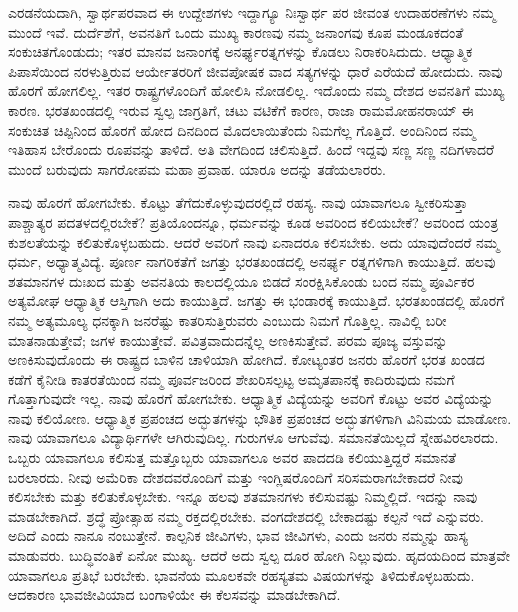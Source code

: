 ಎರಡನೆಯದಾಗಿ, ಸ್ವಾರ್ಥಪರವಾದ ಈ ಉದ್ದೇಶಗಳು ಇದ್ದಾಗ್ಯೂ ನಿಃಸ್ವಾರ್ಥ ಪರ ಜೀವಂತ ಉದಾಹರಣೆಗಳು ನಮ್ಮ ಮುಂದೆ ಇವೆ. ದುರ್ದೆಶೆಗೆ, ಅವನತಿಗೆ ಒಂದು ಮುಖ್ಯ ಕಾರಣವು ನಮ್ಮ ಜನಾಂಗವು ಕೂಪ ಮಂಡೂಕದಂತೆ ಸಂಕುಚಿತಗೊಂಡುದು; ಇತರ ಮಾನವ ಜನಾಂಗಕ್ಕೆ ಅನರ್ಘ್ಯರತ್ನಗಳನ್ನು ಕೊಡಲು ನಿರಾಕರಿಸಿದುದು. ಆಧ್ಯಾತ್ಮಿಕ ಪಿಪಾಸೆಯಿಂದ ನರಳುತ್ತಿರುವ ಆರ್ಯೇತರರಿಗೆ ಜೀವಪೋಷಕ ವಾದ ಸತ್ಯಗಳನ್ನು ಧಾರೆ ಎರೆಯದೆ ಹೋದುದು. ನಾವು ಹೊರಗೆ ಹೋಗಲಿಲ್ಲ. ಇತರ ರಾಷ್ಟ್ರಗಳೊಂದಿಗೆ ಹೋಲಿಸಿ ನೋಡಲಿಲ್ಲ. ಇದೊಂದು ನಮ್ಮ ದೇಶದ ಅವನತಿಗೆ ಮುಖ್ಯ ಕಾರಣ. ಭರತಖಂಡದಲ್ಲಿ ಇರುವ ಸ್ವಲ್ಪ ಜಾಗ್ರತಿಗೆ, ಚಟು ವಟಿಕೆಗೆ ಕಾರಣ, ರಾಜಾ ರಾಮಮೋಹನರಾಯ್​ ಈ ಸಂಕುಚಿತ ಚಿಪ್ಪಿನಿಂದ ಹೊರಗೆ ಹೋದ ದಿನದಿಂದ ಮೊದಲಾಯಿತೆಂದು ನಿಮಗೆಲ್ಲ ಗೊತ್ತಿದೆ. ಅಂದಿನಿಂದ ನಮ್ಮ ಇತಿಹಾಸ ಬೇರೊಂದು ರೂಪವನ್ನು ತಾಳಿದೆ. ಅತಿ ವೇಗದಿಂದ ಚಲಿಸುತ್ತಿದೆ. ಹಿಂದೆ ಇದ್ದವು ಸಣ್ಣ ಸಣ್ಣ ನದಿಗಳಾದರೆ ಮುಂದೆ ಬರುವುದು ಸಾಗರೋಪಮ ಮಹಾ ಪ್ರವಾಹ. ಯಾರೂ ಅದನ್ನು ತಡೆಯಲಾರರು. 

ನಾವು ಹೊರಗೆ ಹೋಗಬೇಕು. ಕೊಟ್ಟು ತೆಗೆದುಕೊಳ್ಳುವುದರಲ್ಲಿದೆ ರಹಸ್ಯ. ನಾವು ಯಾವಾಗಲೂ ಸ್ವೀಕರಿಸುತ್ತಾ ಪಾಶ್ಚಾತ್ಯರ ಪದತಳದಲ್ಲಿರಬೇಕೆ? ಪ್ರತಿಯೊಂದನ್ನೂ, ಧರ್ಮವನ್ನು ಕೂಡ ಅವರಿಂದ ಕಲಿಯಬೇಕೆ? ಅವರಿಂದ ಯಂತ್ರ ಕುಶಲತೆಯನ್ನು ಕಲಿತುಕೊಳ್ಳಬಹುದು. ಆದರೆ ಅವರಿಗೆ ನಾವು ಏನಾದರೂ ಕಲಿಸಬೇಕು. ಅದು ಯಾವುದೆಂದರೆ ನಮ್ಮ ಧರ್ಮ, ಅಧ್ಯಾತ್ಮವಿದ್ಯೆ. ಪೂರ್ಣ ನಾಗರಿಕತೆಗೆ ಜಗತ್ತು ಭರತಖಂಡದಲ್ಲಿ ಅನರ್ಘ್ಯ ರತ್ನಗಳಿಗಾಗಿ ಕಾಯುತ್ತಿದೆ. ಹಲವು ಶತಮಾನಗಳ ದುಃಖದ ಮತ್ತು ಅವನತಿಯ ಕಾಲದಲ್ಲಿಯೂ ಬಿಡದೆ ಸಂರಕ್ಷಿಸಿಕೊಂಡು ಬಂದ ನಮ್ಮ ಪೂರ್ವಿಕರ ಅತ್ಯಮೋಘ ಆಧ್ಯಾತ್ಮಿಕ ಆಸ್ತಿಗಾಗಿ ಅದು ಕಾಯುತ್ತಿದೆ. ಜಗತ್ತು ಈ ಭಂಡಾರಕ್ಕೆ ಕಾಯುತ್ತಿದೆ. ಭರತಖಂಡದಲ್ಲಿ ಹೊರಗೆ ನಮ್ಮ ಅತ್ಯಮೂಲ್ಯ ಧನಕ್ಕಾಗಿ ಜನರೆಷ್ಟು ಕಾತರಿಸುತ್ತಿರುವರು ಎಂಬುದು ನಿಮಗೆ ಗೊತ್ತಿಲ್ಲ. ನಾವಿಲ್ಲಿ ಬರೀ ಮಾತನಾಡುತ್ತೇವೆ; ಜಗಳ ಕಾಯುತ್ತೇವೆ. ಪವಿತ್ರವಾದುದನ್ನೆಲ್ಲ ಅಣಕಿಸುತ್ತೇವೆ. ಪರಮ ಪೂಜ್ಯ ವಸ್ತುವನ್ನು ಅಣಕಿಸುವುದೊಂದು ಈ ರಾಷ್ಟ್ರದ ಬಾಳಿನ ಚಾಳಿಯಾಗಿ ಹೋಗಿದೆ. ಕೋಟ್ಯಂತರ ಜನರು ಹೊರಗೆ ಭರತ ಖಂಡದ ಕಡೆಗೆ ಕೈನೀಡಿ ಕಾತರತೆಯಿಂದ ನಮ್ಮ ಪೂರ್ವಜರಿಂದ ಶೇಖರಿಸಲ್ಪಟ್ಟ ಅಮೃತಪಾನಕ್ಕೆ ಕಾದಿರುವುದು ನಮಗೆ ಗೊತ್ತಾಗುವುದೇ ಇಲ್ಲ. ನಾವು ಹೊರಗೆ ಹೋಗಬೇಕು. ಆಧ್ಯಾತ್ಮಿಕ ವಿದ್ಯೆಯನ್ನು ಅವರಿಗೆ ಕೊಟ್ಟು ಅವರ ವಿದ್ಯೆಯನ್ನು ನಾವು ಕಲಿಯೋಣ. ಆಧ್ಯಾತ್ಮಿಕ ಪ್ರಪಂಚದ ಅದ್ಭುತಗಳನ್ನು ಭೌತಿಕ ಪ್ರಪಂಚದ ಅದ್ಭುತಗಳಿಗಾಗಿ ವಿನಿಮಯ ಮಾಡೋಣ. ನಾವು ಯಾವಾಗಲೂ ವಿದ್ಯಾರ್ಥಿಗಳೇ ಆಗಿರುವುದಿಲ್ಲ. ಗುರುಗಳೂ ಆಗುವೆವು. ಸಮಾನತೆಯಿಲ್ಲದೆ ಸ್ನೇಹವಿರಲಾರದು. ಒಬ್ಬರು ಯಾವಾಗಲೂ ಕಲಿಸುತ್ತ ಮತ್ತೊಬ್ಬರು ಯಾವಾಗಲೂ ಅವರ ಪಾದದಡಿ ಕಲಿಯುತ್ತಿದ್ದರೆ ಸಮಾನತೆ ಬರಲಾರದು. ನೀವು ಅಮೆರಿಕಾ ದೇಶದವರೊಂದಿಗೆ ಮತ್ತು ಇಂಗ್ಲಿಷರೊಂದಿಗೆ ಸರಿಸಮರಾಗಬೇಕಾದರೆ ನೀವು ಕಲಿಸಬೇಕು ಮತ್ತು ಕಲಿತುಕೊಳ್ಳಬೇಕು. ಇನ್ನೂ ಹಲವು ಶತಮಾನಗಳು ಕಲಿಸುವಷ್ಟು ನಿಮ್ಮಲ್ಲಿದೆ. ಇದನ್ನು ನಾವು ಮಾಡಬೇಕಾಗಿದೆ. ಶ್ರದ್ಧೆ ಪ್ರೋತ್ಸಾಹ ನಮ್ಮ ರಕ್ತದಲ್ಲಿರಬೇಕು. ವಂಗದೇಶದಲ್ಲಿ ಬೇಕಾದಷ್ಟು ಕಲ್ಪನೆ ಇದೆ ಎನ್ನುವರು. ಅದಿದೆ ಎಂದು ನಾನೂ ನಂಬುತ್ತೇನೆ. ಕಾಲ್ಪನಿಕ ಜೀವಿಗಳು, ಭಾವ ಜೀವಿಗಳು, ಎಂದು ಜನರು ನಮ್ಮನ್ನು ಹಾಸ್ಯ ಮಾಡುವರು. ಬುದ್ಧಿವಂತಿಕೆ ಏನೋ ಮುಖ್ಯ. ಆದರೆ ಅದು ಸ್ವಲ್ಪ ದೂರ ಹೋಗಿ ನಿಲ್ಲುವುದು. ಹೃದಯದಿಂದ ಮಾತ್ರವೇ ಯಾವಾಗಲೂ ಪ್ರತಿಭೆ ಬರಬೇಕು. ಭಾವನೆಯ ಮೂಲಕವೇ ರಹಸ್ಯತಮ ವಿಷಯಗಳನ್ನು ತಿಳಿದುಕೊಳ್ಳಬಹುದು. ಆದಕಾರಣ ಭಾವಜೀವಿಯಾದ ಬಂಗಾಳಿಯೇ ಈ ಕೆಲಸವನ್ನು ಮಾಡಬೇಕಾಗಿದೆ. 

